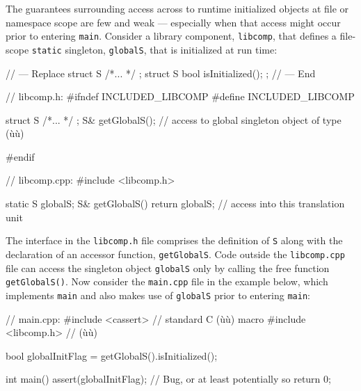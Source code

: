 The guarantees surrounding access across  to runtime
initialized objects at file or namespace scope are few and weak ---
especially when that access might occur prior to entering \lstinline!main!.
Consider a library component, \lstinline!libcomp!, that defines a
file-scope \lstinline!static! singleton, \lstinline!globalS!, that is
initialized at run time:

\begin{emcppshiddenlisting}[emcppsbatch=e7]
// --- Replace
struct S { /*... */ };
struct S {
  bool isInitialized();
};
// --- End
\end{emcppshiddenlisting}
\begin{emcppslisting}[emcppsbatch=e7]
// libcomp.h:
#ifndef INCLUDED_LIBCOMP
#define INCLUDED_LIBCOMP

struct S { /*... */ };
S& getGlobalS();  // access to global singleton object of type (ù{}ù)

#endif
\end{emcppslisting}
\vspace*{2ex} %


\begin{emcppslisting}[emcppsbatch=e7]
// libcomp.cpp:
#include <libcomp.h>

static S globalS;
S& getGlobalS() { return globalS; }  // access into this translation unit
\end{emcppslisting}
\newpage%

\noindent The interface in the \lstinline!libcomp.h! file comprises the definition of
\lstinline!S! along with the declaration of an accessor function,
\lstinline!getGlobalS!. Code outside the \lstinline!libcomp.cpp! file can access the singleton object \lstinline!globalS! only by calling the free function \lstinline!getGlobalS()!. Now consider the
 \lstinline!main.cpp!
  file in the example below, which  implements
\lstinline!main! and also makes use of \lstinline!globalS! prior to entering
\lstinline!main!:


\begin{emcppslisting}[emcppsbatch=e7]
// main.cpp:
#include <cassert>    // standard C (ù{}ù) macro
#include <libcomp.h>  // (ù{}ù)

bool globalInitFlag = getGlobalS().isInitialized();

int main()
{
    assert(globalInitFlag);   // Bug, or at least potentially so
    return 0;
}
\end{emcppslisting}

